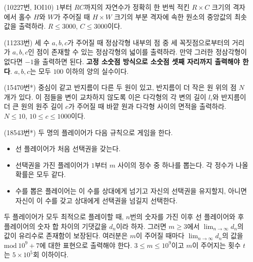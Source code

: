 \begin{problem}
    (10227번, IOI10) $1$부터 $RC$까지의 자연수가 정확히 한 번씩 적킨 $R \times C$ 크기의 격자에서 홀수 $H$와 $W$가 주어질 때 $H \times W$ 크기의 부분 격자에 속한 원소의 중앙값의 최솟값을 출력하라. $R \leq 3000$, $C \leq 3000$이다.
\end{problem}

\begin{problem}
    (11233번) 세 수 $a, b, c$가 주어질 때 정삼각형 내부의 점 중 세 꼭짓점으로부터의 거리가 $a, b, c$인 점이 존재할 수 있는 정삼각형의 넓이를 출력하라. 만약 그러한 정삼각형이 없다면 $-1$을 출력하면 된다. \textbf{고정 소숫점 방식으로 소숫점 셋째 자리까지 출력해야 한다}. $a, b, c$는 모두 $100$ 이하의 양의 실수이다.
\end{problem}

\begin{problem}
    (15470번*) 중심이 같고 반지름이 다른 두 원이 있고, 반지름이 더 작은 원 위의 점 $N$개가 있다. 이 점들을 변이 교차하지 않도록 이은 다각형의 각 변의 길이 $l_i$와 반지름이 더 큰 원의 원주 길이 $c$가 주어질 때 바깥 원과 다각형 사이의 면적을 출력하라. $N \leq 10$, $10 \leq c \leq 1000$이다.
\end{problem}

\begin{problem}
    (18543번*) 두 명의 플레이어가 다음 규칙으로 게임을 한다.
    \begin{itemize}
        \item 선 플레이어가 처음 선택권을 갖는다.
        \item 선택권을 가진 플레이어가 $1$부터 $m$ 사이의 정수 중 하나를 뽑는다. 각 정수가 나올 확률은 모두 같다.
        \item 수를 뽑은 플레이어는 이 수를 상대에게 넘기고 자신의 선택권을 유지할지, 아니면 자신이 이 수를 갖고 상대에게 선택권을 넘길지 선택한다.
    \end{itemize}
    두 플레이어가 모두 최적으로 플레이할 때, $n$번의 숫자를 가진 이후 선 플레이어와 후 플레이어의 숫자 합 차이의 기댓값을 $d_n$이라 하자. 그러면 $m \geq 3$에서 $\lim_{n \rightarrow \infty} d_n$의 값이 유리수로 존재함이 보장된다. 여러분은 $m$이 주어질 때마다 $\lim_{n \rightarrow \infty} d_n$의 값을 $\textrm{mod}~10^9+7$에 대한 표현으로 출력해야 한다. $3 \leq m \leq 10^9$이고 $m$이 주어지는 횟수 $t$는 $5 \times 10^5$회 이하이다.
\end{problem}

